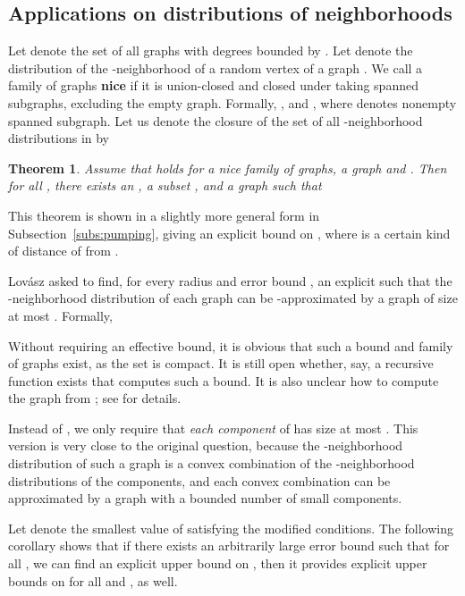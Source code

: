 \documentclass[12pt,a4paper]{article}
\newtheorem{Theorem}{Theorem}
\renewcommand{\:}{\colon}
\begin{document}
\subsection{Applications on distributions of neighborhoods}\label{subsec:AL}

Let  denote the set of all graphs with degrees bounded by .
Let  denote the distribution of the -neighborhood of a random vertex of a graph .
We call a family  of graphs \textbf{nice} if it is union-closed and closed under taking spanned subgraphs, excluding the empty graph. 
Formally, ,  and , where  denotes nonempty spanned subgraph. 
Let us denote the closure of the set of all -neighborhood distributions in  by 


\begin{Theorem} \label{separation}
Assume that  holds for a nice family  of graphs, a graph  and .
Then for all , there exists an , a subset , and a graph  such that 

\end{Theorem}

This theorem is shown in a slightly more general form in Subsection~\ref{subs:pumping}, giving an explicit bound on , where  is a certain kind of distance of  from .

Lovász \cite{Lovaszbook} asked to find, for every radius  and error bound , an explicit  such that the -neighborhood distribution of each graph can be -approximated by a graph of size at most . Formally,


Without requiring an effective bound, it is obvious that such a bound  and family of graphs exist, as the set  is compact. 
It is still open whether, say, a recursive function exists that computes such a bound. 
It is also unclear how to compute the graph  from ; see \cite{Lovaszbook} for details.

Instead of , we only require that \emph{each component} of  has size at most . This version is very close to the original question, because the -neighborhood distribution of such a graph is a convex combination of the -neighborhood distributions of the components, and each convex combination can be approximated by a graph with a bounded number of small components.

Let  denote the smallest value of  satisfying the modified conditions. 
The following corollary shows that if there exists an arbitrarily large error bound  such that for all , we can find an explicit upper bound on , then it provides explicit upper bounds on  for all  and , as well.
\end{document}
